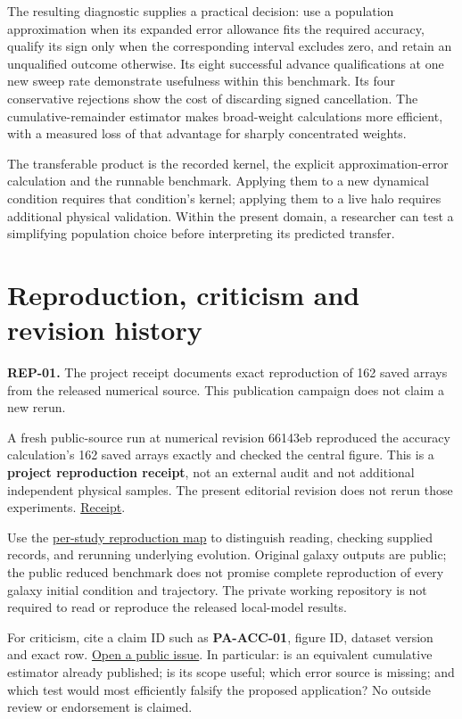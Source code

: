 \documentclass[fleqn,usenatbib]{mnras}
\begin{document}
The resulting diagnostic supplies a practical decision: use a population approximation when its expanded error allowance fits the required accuracy, qualify its sign only when the corresponding interval excludes zero, and retain an unqualified outcome otherwise. Its eight successful advance qualifications at one new sweep rate demonstrate usefulness within this benchmark. Its four conservative rejections show the cost of discarding signed cancellation. The cumulative-remainder estimator makes broad-weight calculations more efficient, with a measured loss of that advantage for sharply concentrated weights.

The transferable product is the recorded kernel, the explicit approximation-error calculation and the runnable benchmark. Applying them to a new dynamical condition requires that condition's kernel; applying them to a live halo requires additional physical validation. Within the present domain, a researcher can test a simplifying population choice before interpreting its predicted transfer.

\section{Reproduction, criticism and revision history}\label{reproduction}

\textbf{REP-01.} The project receipt documents exact reproduction of 162 saved arrays from the released numerical source. This publication campaign does not claim a new rerun.

A fresh public-source run at numerical revision 66143eb reproduced the accuracy calculation's 162 saved arrays exactly and checked the central figure. This is a \textbf{project reproduction receipt}, not an external audit and not additional independent physical samples. The present editorial revision does not rerun those experiments. \href{https://djova.ca/galaxy-bar/diagnostics/population-accuracy/accuracy-reproduction.json}{Receipt}.

Use the \href{https://djova.ca/galaxy-bar/reproduce.html}{per-study reproduction map} to distinguish reading, checking supplied records, and rerunning underlying evolution. Original galaxy outputs are public; the public reduced benchmark does not promise complete reproduction of every galaxy initial condition and trajectory. The private working repository is not required to read or reproduce the released local-model results.

For criticism, cite a claim ID such as \textbf{PA-ACC-01}, figure ID, dataset version and exact row. \href{https://github.com/djova/bar-halo-benchmark/issues}{Open a public issue}. In particular: is an equivalent cumulative estimator already published; is its scope useful; which error source is missing; and which test would most efficiently falsify the proposed application? No outside review or endorsement is claimed.
\end{document}
